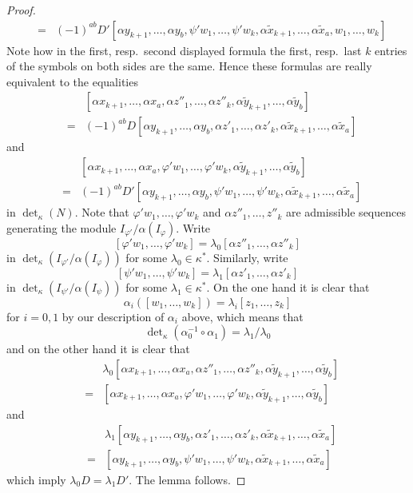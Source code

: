\documentclass[10pt,a4paper]{amsart}
\theoremstyle{plain}
\theoremstyle{definition}
\theoremstyle{remark}
\numberwithin{equation}{subsection}
\begin{document}
\begin{proof}
\begin{eqnarray*}
& = &
(-1)^{ab} D'
[\alpha y_{k + 1}, \ldots, \alpha y_b,
\psi' w_1, \ldots, \psi' w_k,
\alpha \tilde x_{k + 1}, \ldots, \alpha \tilde x_a,
w_1, \ldots, w_k]
\end{eqnarray*}
Note how in the first, resp.\ second displayed formula
the first, resp.\ last $k$ entries of the symbols on both sides
are the same. Hence these formulas are really equivalent to the
equalities
\begin{eqnarray*}
& &
[\alpha x_{k + 1}, \ldots, \alpha x_a,
\alpha z''_1, \ldots, \alpha z''_k,
\alpha \tilde y_{k + 1}, \ldots, \alpha \tilde y_b] \\
& = &
(-1)^{ab} D
[\alpha y_{k + 1}, \ldots, \alpha y_b,
\alpha z'_1, \ldots, \alpha z'_k,
\alpha \tilde x_{k + 1}, \ldots, \alpha \tilde x_a]
\end{eqnarray*}
and
\begin{eqnarray*}
& &
[\alpha x_{k + 1}, \ldots, \alpha x_a,
\varphi' w_1, \ldots, \varphi' w_k,
\alpha \tilde y_{k + 1}, \ldots, \alpha \tilde y_b]
\\
& = &
(-1)^{ab} D'
[\alpha y_{k + 1}, \ldots, \alpha y_b,
\psi' w_1, \ldots, \psi' w_k,
\alpha \tilde x_{k + 1}, \ldots, \alpha \tilde x_a]
\end{eqnarray*}
in $\det_\kappa(N)$. Note that
$\varphi' w_1, \ldots, \varphi' w_k$
and
$\alpha z''_1, \ldots, z''_k$
are admissible sequences generating the module
$I_{\varphi'}/\alpha(I_\varphi)$. Write
$$
[\varphi' w_1, \ldots, \varphi' w_k]
= \lambda_0 [\alpha z''_1, \ldots, \alpha z''_k]
$$
in $\det_\kappa(I_{\varphi'}/\alpha(I_\varphi))$
for some $\lambda_0 \in \kappa^*$. Similarly,
write
$$
[\psi' w_1, \ldots, \psi' w_k]
= \lambda_1 [\alpha z'_1, \ldots, \alpha z'_k]
$$
in $\det_\kappa(I_{\psi'}/\alpha(I_\psi))$
for some $\lambda_1 \in \kappa^*$. On the one hand
it is clear that
$$
\alpha_i([w_1, \ldots, w_k]) = \lambda_i[z_1, \ldots, z_k]
$$
for $i = 0, 1$ by our description of $\alpha_i$ above,
which means that
$$
\det\nolimits_\kappa(\alpha_0^{-1} \circ \alpha_1)
=
\lambda_1/\lambda_0
$$
and
on the other hand it is clear that
\begin{eqnarray*}
& &
\lambda_0 [\alpha x_{k + 1}, \ldots, \alpha x_a,
\alpha z''_1, \ldots, \alpha z''_k,
\alpha \tilde y_{k + 1}, \ldots, \alpha \tilde y_b] \\
& = &
[\alpha x_{k + 1}, \ldots, \alpha x_a,
\varphi' w_1, \ldots, \varphi' w_k,
\alpha \tilde y_{k + 1}, \ldots, \alpha \tilde y_b]
\end{eqnarray*}
and
\begin{eqnarray*}
& &
\lambda_1[\alpha y_{k + 1}, \ldots, \alpha y_b,
\alpha z'_1, \ldots, \alpha z'_k,
\alpha \tilde x_{k + 1}, \ldots, \alpha \tilde x_a] \\
& = &
[\alpha y_{k + 1}, \ldots, \alpha y_b,
\psi' w_1, \ldots, \psi' w_k,
\alpha \tilde x_{k + 1}, \ldots, \alpha \tilde x_a]
\end{eqnarray*}
which imply $\lambda_0 D = \lambda_1 D'$. The lemma follows.
\end{proof}



\end{document}
